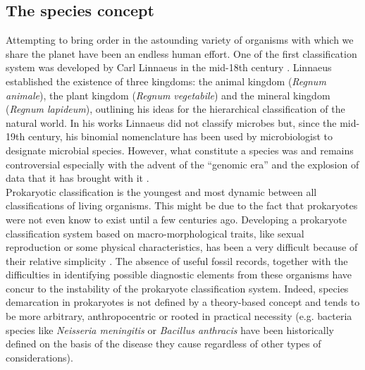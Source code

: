 \subsection{The species concept}
Attempting to bring order in the astounding variety of organisms with which we share the planet have been an endless human effort. One of the first classification system was developed by Carl Linnaeus in the mid-18th century \cite{linnaeus1800species, bhl10277}. Linnaeus established the existence of three kingdoms: the animal kingdom (\textit{Regnum animale}), the plant kingdom (\textit{Regnum vegetabile}) and the mineral kingdom (\textit{Regnum lapideum}), outlining his ideas for the hierarchical classification of the natural world. In his works Linnaeus did not classify microbes but, since the mid-19th century, his binomial nomenclature has been used by microbiologist to designate microbial species. However, what constitute a species was and remains  controversial especially with the advent of the ``genomic era'' and the explosion of data that it has brought with it \cite{doolittle2006genomics}.\\
Prokaryotic classification is the youngest and most dynamic between all classifications of living organisms. This might be due to the fact that prokaryotes were not even know to exist until a few centuries ago. Developing a prokaryote classification system based on macro-morphological traits, like sexual reproduction or some physical characteristics, has been a very difficult because of their relative simplicity \cite{cowan1965principles}. The absence of useful fossil records, together with the difficulties in identifying possible diagnostic elements from these organisms have concur to the instability of the prokaryote classification system. Indeed, species demarcation in prokaryotes is not defined by a theory-based concept and tends to be more arbitrary, anthropocentric or rooted in practical necessity (e.g. bacteria species like \textit{Neisseria meningitis} or \textit{Bacillus anthracis} have been historically defined on the basis of the disease they cause regardless of other types of considerations).\\
